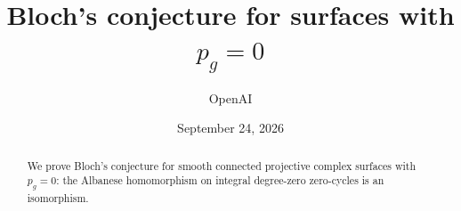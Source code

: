\documentclass[11pt]{article}
\title{Bloch's conjecture for surfaces with \(p_g=0\)}
\author{OpenAI}
\date{September 24, 2026}
\theoremstyle{definition}
\theoremstyle{remark}
\numberwithin{equation}{section}
\begin{document}
\maketitle
\begin{abstract}
We prove Bloch's conjecture for smooth connected projective complex
surfaces with \(p_g=0\): the Albanese homomorphism on integral
degree-zero zero-cycles is an isomorphism.
\end{abstract}









\end{document}
